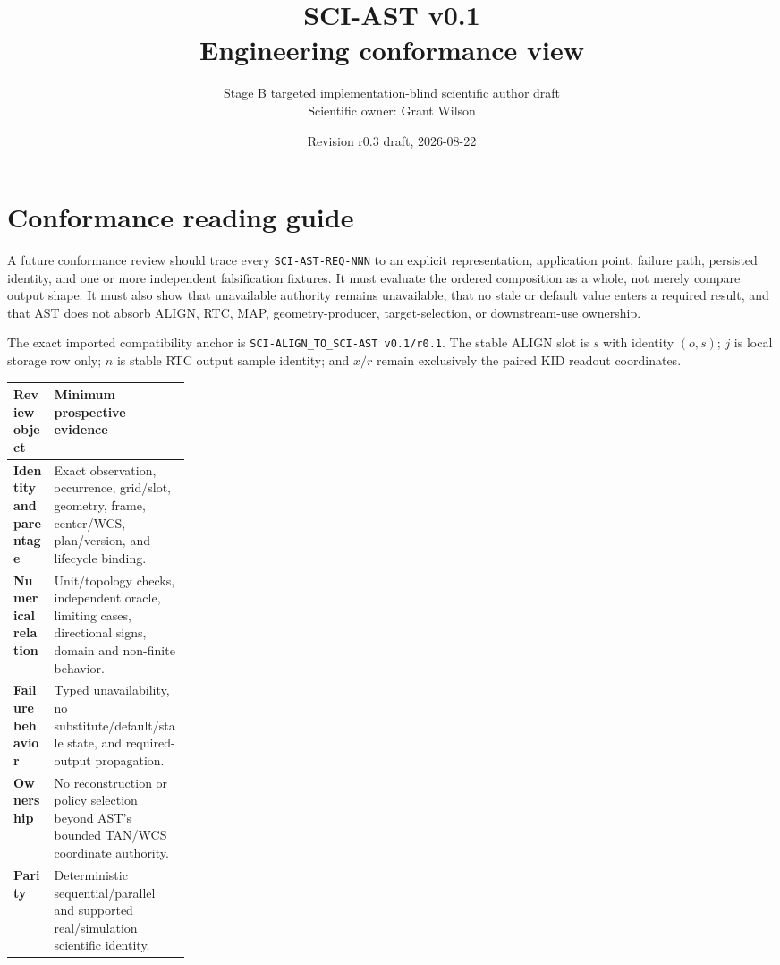 \documentclass[10pt]{article}
\title{\vspace{-1.3em}\textcolor{astnavy}{\textbf{SCI-AST v0.1}}\\
\large Engineering conformance view}
\author{Stage B targeted implementation-blind scientific author draft\\
Scientific owner: Grant Wilson}
\date{Revision r0.3 draft, 2026-08-22}
\begin{document}
\maketitle
\thispagestyle{empty}

\begin{center}
\end{center}

\section*{Conformance reading guide}

A future conformance review should trace every \texttt{SCI-AST-REQ-NNN} to an
explicit representation, application point, failure path, persisted identity,
and one or more independent falsification fixtures.  It must evaluate the
ordered composition as a whole, not merely compare output shape.  It must also
show that unavailable authority remains unavailable, that no stale or default
value enters a required result, and that AST does not absorb ALIGN, RTC, MAP,
geometry-producer, target-selection, or downstream-use ownership.

The exact imported compatibility anchor is
\nolinkurl{SCI-ALIGN_TO_SCI-AST v0.1/r0.1}.  The stable ALIGN slot is $s$ with
identity $(o,s)$; $j$ is local storage row only; $n$ is stable RTC output
sample identity; and $x/r$ remain exclusively the paired KID readout
coordinates.

\begin{center}
\begin{tabularx}{0.96\linewidth}{>{\bfseries}p{0.23\linewidth}X}
\toprule
Review object & Minimum prospective evidence \\
\midrule
Identity and parentage & Exact observation, occurrence, grid/slot, geometry,
frame, center/WCS, plan/version, and lifecycle binding. \\
Numerical relation & Unit/topology checks, independent oracle, limiting cases,
directional signs, domain and non-finite behavior. \\
Failure behavior & Typed unavailability, no substitute/default/stale state,
and required-output propagation. \\
Ownership & No reconstruction or policy selection beyond AST's bounded
TAN/WCS coordinate authority. \\
Parity & Deterministic sequential/parallel and supported real/simulation
scientific identity. \\
\bottomrule
\end{tabularx}
\end{center}
\end{document}
